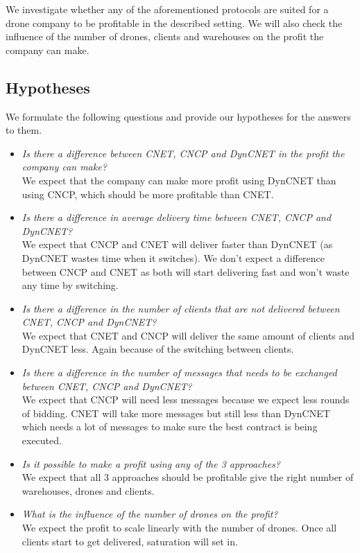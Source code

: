 \documentclass[10pt,a4paper]{article}
\begin{document}
We investigate whether any of the aforementioned protocols are suited for a drone company to be profitable in the described setting. We will also check the influence of the number of drones, clients and warehouses on the profit the company can make.
\subsection{Hypotheses}
We formulate the following questions and provide our hypotheses for the answers to them.
\begin{itemize}
\item \textit{Is there a difference between CNET, CNCP and DynCNET in the profit the company can make?} \\
We expect that the company can make more profit using DynCNET than using CNCP, which should be more profitable than CNET.
\item\textit{Is there a difference in average delivery time between CNET, CNCP and DynCNET?} \\
We expect that CNCP and CNET will deliver faster than DynCNET (as DynCNET wastes time when it switches). We don't expect a difference between CNCP and CNET as both will start delivering fast and won't waste any time by switching.

\item\textit{Is there a difference in the number of clients that are not delivered between CNET, CNCP and DynCNET?} \\
We expect that CNET and CNCP will deliver the same amount of clients and DynCNET less. Again because of the switching between clients.

\item\textit{Is there a difference in the number of messages that needs to be exchanged between CNET, CNCP and DynCNET?}\\
We expect that CNCP will need less messages because we expect less rounds of bidding. CNET will take more messages but still less than DynCNET which needs a lot of messages to make sure the best contract is being executed. 

\item\textit{Is it possible to make a profit using any of the 3 approaches?}\\
We expect that all 3 approaches should be profitable give the right number of warehouses, drones and clients.

\item\textit{What is the influence of the number of drones on the profit?}\\
We expect the profit to scale linearly with the number of drones. Once all clients start to get delivered, saturation will set in.


\end{itemize}
\end{document}
